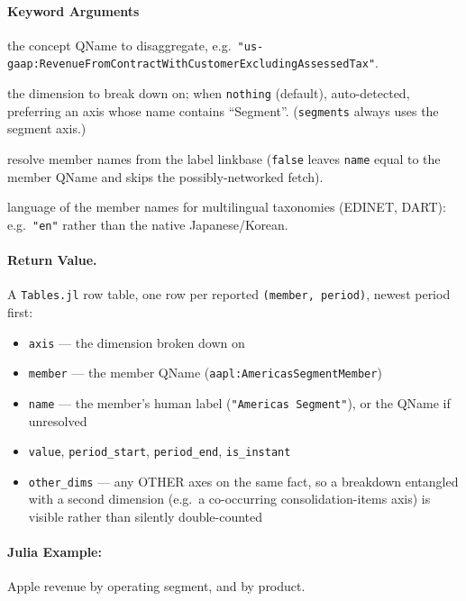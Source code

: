 \documentclass[11pt,a4paper]{report}
\begin{document}
\paragraph{Keyword Arguments}
\begin{description}[nosep]
  \item[\quad - \texttt{concept}] the concept QName to disaggregate, e.g.\ \texttt{"us-gaap:RevenueFromContractWithCustomerExcludingAssessedTax"}.
  \item[\quad - \texttt{axis}] the dimension to break down on; when \texttt{nothing} (default), auto-detected, preferring an axis whose name contains ``Segment''. (\texttt{segments} always uses the segment axis.)
  \item[\quad - \texttt{labels}] resolve member names from the label linkbase (\texttt{false} leaves \texttt{name} equal to the member QName and skips the possibly-networked fetch).
  \item[\quad - \texttt{lang}] language of the member names for multilingual taxonomies (EDINET, DART): e.g.\ \texttt{"en"} rather than the native Japanese/Korean.
\end{description}


\paragraph{Return Value.}
A \texttt{Tables.jl} row table, one row per reported \texttt{(member, period)}, newest period first:
\begin{itemize}[nosep]
  \item \texttt{axis} --- the dimension broken down on
  \item \texttt{member} --- the member QName (\texttt{aapl:AmericasSegmentMember})
  \item \texttt{name} --- the member's human label (\texttt{"Americas Segment"}), or the QName if unresolved
  \item \texttt{value}, \texttt{period\_start}, \texttt{period\_end}, \texttt{is\_instant}
  \item \texttt{other\_dims} --- any OTHER axes on the same fact, so a breakdown entangled with a second dimension (e.g.\ a co-occurring consolidation-items axis) is visible rather than silently double-counted
\end{itemize}

\paragraph{Julia Example:} Apple revenue by operating segment, and by product.
\end{document}
